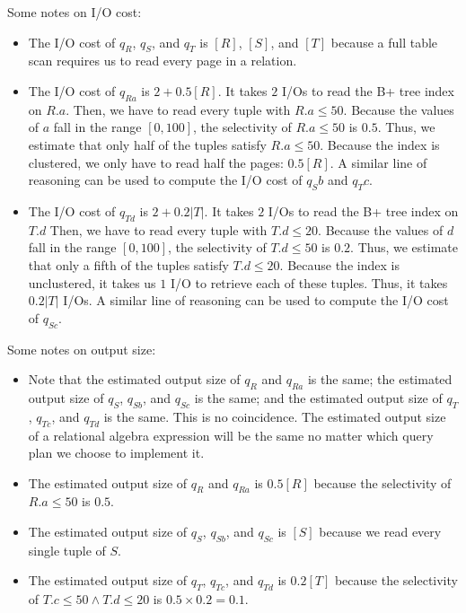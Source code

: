 \documentclass{article}
\begin{document}
Some notes on I/O cost:
\begin{itemize}
  \item
    The I/O cost of $q_{R}$, $q_{S}$, and $q_{T}$ is $[R]$, $[S]$, and $[T]$
    because a full table scan requires us to read every page in a relation.
  \item
    The I/O cost of $q_{Ra}$ is $2 + 0.5[R]$. It takes $2$ I/Os to read the B+
    tree index on $R.a$. Then, we have to read every tuple with $R.a \leq 50$.
    Because the values of $a$ fall in the range $[0, 100]$, the selectivity of
    $R.a \leq 50$ is $0.5$. Thus, we estimate that only half of the tuples
    satisfy $R.a \leq 50$. Because the index is clustered, we only have to read
    half the pages: $0.5[R]$. A similar line of reasoning can be used to
    compute the I/O cost of $q_Sb$ and $q_Tc$.

  \item
    The I/O cost of $q_{Td}$ is $2 + 0.2|T|$. It takes $2$ I/Os to read the B+
    tree index on $T.d$ Then, we have to read every tuple with $T.d \leq 20$.
    Because the values of $d$ fall in the range $[0, 100]$, the selectivity of
    $T.d \leq 50$ is $0.2$. Thus, we estimate that only a fifth of the tuples
    satisfy $T.d \leq 20$. Because the index is unclustered, it takes us $1$
    I/O to retrieve each of these tuples. Thus, it takes $0.2|T|$ I/Os.  A
    similar line of reasoning can be used to compute the I/O cost of $q_{Sc}$.
\end{itemize}

Some notes on output size:
\begin{itemize}
  \item
    Note that the estimated output size of $q_R$ and $q_{Ra}$ is the same; the
    estimated output size of $q_S$, $q_{Sb}$, and $q_{Sc}$ is the same; and the
    estimated output size of $q_T$, $q_{Tc}$, and $q_{Td}$ is the same. This is
    no coincidence. The estimated output size of a relational algebra
    expression will be the same no matter which query plan we choose to
    implement it.

  \item
    The estimated output size of $q_R$ and $q_{Ra}$ is $0.5[R]$ because the
    selectivity of $R.a \leq 50$ is $0.5$.

  \item
    The estimated output size of $q_S$, $q_{Sb}$, and $q_{Sc}$ is $[S]$ because
    we read every single tuple of $S$.

  \item
    The estimated output size of $q_T$, $q_{Tc}$, and $q_{Td}$ is $0.2[T]$
    because the selectivity of $T.c \leq 50 \land T.d \leq 20$ is $0.5 \times
    0.2 = 0.1$.
\end{itemize}
\end{document}
